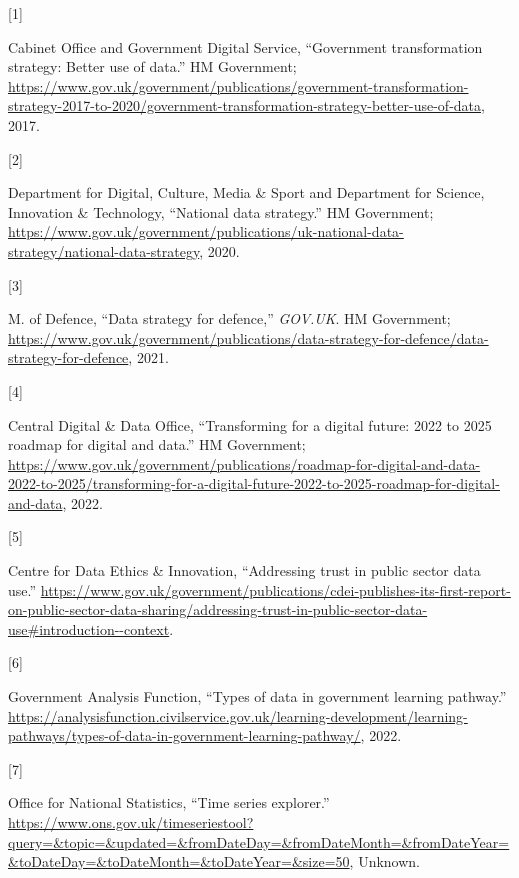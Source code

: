 \documentclass{article}
\newlength{\cslhangindent}
\newlength{\csllabelwidth}
\newlength{\cslentryspacingunit} %
\newenvironment{CSLReferences}[2] %
 {%
  \setlength{\parindent}{0pt}
  \ifodd #1
  \let\oldpar\par
  \def\par{\hangindent=\cslhangindent\oldpar}
  \fi
  \setlength{\parskip}{#2\cslentryspacingunit}
 }%
 {}
\newcommand{\CSLLeftMargin}[1]{\parbox[t]{\csllabelwidth}{#1}}
\newcommand{\CSLRightInline}[1]{\parbox[t]{\linewidth - \csllabelwidth}{#1}\break}
\begin{document}
\hypertarget{refs}{}
\begin{CSLReferences}{0}{0}
\leavevmode{}%
\CSLLeftMargin{{[}1{]} }
\CSLRightInline{Cabinet Office and Government Digital Service,
{``Government transformation strategy: Better use of data.''} HM
Government;
\url{https://www.gov.uk/government/publications/government-transformation-strategy-2017-to-2020/government-transformation-strategy-better-use-of-data},
2017.}

\leavevmode{}%
\CSLLeftMargin{{[}2{]} }
\CSLRightInline{Department for Digital, Culture, Media \& Sport and
Department for Science, Innovation \& Technology, {``National data
strategy.''} HM Government;
\url{https://www.gov.uk/government/publications/uk-national-data-strategy/national-data-strategy},
2020.}

\leavevmode{}%
\CSLLeftMargin{{[}3{]} }
\CSLRightInline{M. of Defence, {``Data strategy for defence,''}
\emph{GOV.UK}. HM Government;
\url{https://www.gov.uk/government/publications/data-strategy-for-defence/data-strategy-for-defence},
2021.}

\leavevmode{}%
\CSLLeftMargin{{[}4{]} }
\CSLRightInline{Central Digital \& Data Office, {``Transforming for a
digital future: 2022 to 2025 roadmap for digital and data.''} HM
Government;
\url{https://www.gov.uk/government/publications/roadmap-for-digital-and-data-2022-to-2025/transforming-for-a-digital-future-2022-to-2025-roadmap-for-digital-and-data},
2022.}

\leavevmode{}%
\CSLLeftMargin{{[}5{]} }
\CSLRightInline{Centre for Data Ethics \& Innovation, {``Addressing
trust in public sector data use.''}
\url{https://www.gov.uk/government/publications/cdei-publishes-its-first-report-on-public-sector-data-sharing/addressing-trust-in-public-sector-data-use\#introduction--context}.}

\leavevmode{}%
\CSLLeftMargin{{[}6{]} }
\CSLRightInline{Government Analysis Function, {``Types of data in
government learning pathway.''}
\url{https://analysisfunction.civilservice.gov.uk/learning-development/learning-pathways/types-of-data-in-government-learning-pathway/},
2022.}

\leavevmode{}%
\CSLLeftMargin{{[}7{]} }
\CSLRightInline{Office for National Statistics, {``Time series
explorer.''}
\url{https://www.ons.gov.uk/timeseriestool?query=\&topic=\&updated=\&fromDateDay=\&fromDateMonth=\&fromDateYear=\&toDateDay=\&toDateMonth=\&toDateYear=\&size=50},
Unknown.}


\end{CSLReferences}
\end{document}
